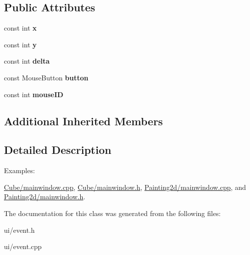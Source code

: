 \subsection*{Public Attributes}
\begin{DoxyCompactItemize}
\item 
\hypertarget{class_tempest_1_1_mouse_event_a8e1c63ccedd5bb6213891de0a441e6f4}{const int {\bfseries x}}\label{class_tempest_1_1_mouse_event_a8e1c63ccedd5bb6213891de0a441e6f4}

\item 
\hypertarget{class_tempest_1_1_mouse_event_ae8e7232e1c7af737513f2712cd860cea}{const int {\bfseries y}}\label{class_tempest_1_1_mouse_event_ae8e7232e1c7af737513f2712cd860cea}

\item 
\hypertarget{class_tempest_1_1_mouse_event_af59e72cfe86c61bc41143f4035607c52}{const int {\bfseries delta}}\label{class_tempest_1_1_mouse_event_af59e72cfe86c61bc41143f4035607c52}

\item 
\hypertarget{class_tempest_1_1_mouse_event_ac5a87cdb74aafc1fd472ee77b776973a}{const Mouse\+Button {\bfseries button}}\label{class_tempest_1_1_mouse_event_ac5a87cdb74aafc1fd472ee77b776973a}

\item 
\hypertarget{class_tempest_1_1_mouse_event_a1922afc293095cba9f7b56ce69d7e3d0}{const int {\bfseries mouse\+I\+D}}\label{class_tempest_1_1_mouse_event_a1922afc293095cba9f7b56ce69d7e3d0}

\end{DoxyCompactItemize}
\subsection*{Additional Inherited Members}


\subsection{Detailed Description}
\begin{Desc}
\item[Examples\+: ]\par
\hyperlink{_cube_2mainwindow_8cpp-example}{Cube/mainwindow.\+cpp}, \hyperlink{_cube_2mainwindow_8h-example}{Cube/mainwindow.\+h}, \hyperlink{_painting2d_2mainwindow_8cpp-example}{Painting2d/mainwindow.\+cpp}, and \hyperlink{_painting2d_2mainwindow_8h-example}{Painting2d/mainwindow.\+h}.\end{Desc}


The documentation for this class was generated from the following files\+:\begin{DoxyCompactItemize}
\item 
ui/event.\+h\item 
ui/event.\+cpp\end{DoxyCompactItemize}
